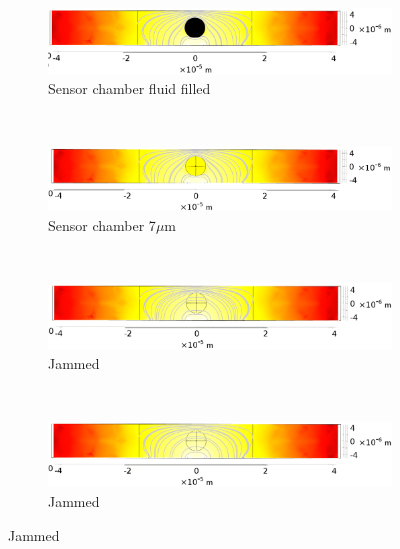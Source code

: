 \begin{figure}[h]
    \centering
    \begin{subfigure}[b]{\textwidth}
        \centering
        \includegraphics[width=\textwidth]{images/simple_cell_DC.png}
        \caption{Sensor chamber fluid filled}
    \end{subfigure}
    \\
    \vspace{0.1 in}
    \begin{subfigure}[b]{\textwidth}
        \centering
        \includegraphics[width=\textwidth]{images/simple_cell_1Mhz.png}
        \caption{Sensor chamber 7$\mu$m }
    \end{subfigure}
    \\
    \vspace{0.1 in}
    \begin{subfigure}[b]{\textwidth}
        \centering
        \includegraphics[width=\textwidth]{images/simple_cell_10Mhz.png}
        \caption{Jammed}
    \end{subfigure}
        \\
    \vspace{0.1 in}
    \begin{subfigure}[b]{\textwidth}
        \centering
        \includegraphics[width=\textwidth]{images/simple_cell_1Ghz.png}
        \caption{Jammed}
    \end{subfigure}

\end{figure}
